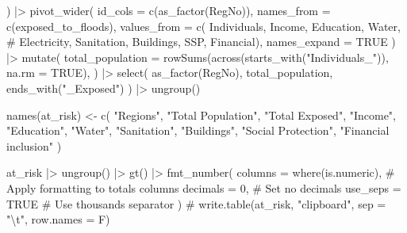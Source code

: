 \documentclass[
  letterpaper,
  DIV=11,
  numbers=noendperiod]{scrartcl}
\newenvironment{Shaded}{}{}
\newcommand{\AttributeTok}[1]{\textcolor[rgb]{0.84,0.23,0.29}{#1}}
\newcommand{\CommentTok}[1]{\textcolor[rgb]{0.42,0.45,0.49}{#1}}
\newcommand{\ConstantTok}[1]{\textcolor[rgb]{0.00,0.36,0.77}{#1}}
\newcommand{\DecValTok}[1]{\textcolor[rgb]{0.00,0.36,0.77}{#1}}
\newcommand{\FunctionTok}[1]{\textcolor[rgb]{0.44,0.26,0.76}{#1}}
\newcommand{\NormalTok}[1]{\textcolor[rgb]{0.14,0.16,0.18}{#1}}
\newcommand{\OtherTok}[1]{\textcolor[rgb]{0.44,0.26,0.76}{#1}}
\newcommand{\SpecialCharTok}[1]{\textcolor[rgb]{0.00,0.36,0.77}{#1}}
\newcommand{\StringTok}[1]{\textcolor[rgb]{0.01,0.18,0.38}{#1}}
\begin{document}
\begin{Shaded}
\begin{Highlighting}[]
\NormalTok{  ) }\SpecialCharTok{|\textgreater{}} 
  \FunctionTok{pivot\_wider}\NormalTok{(}
    \AttributeTok{id\_cols =} \FunctionTok{c}\NormalTok{(}\StringTok{\textasciigrave{}}\AttributeTok{as\_factor(RegNo)}\StringTok{\textasciigrave{}}\NormalTok{),}
    \AttributeTok{names\_from =} \FunctionTok{c}\NormalTok{(exposed\_to\_floods),}
    \AttributeTok{values\_from =} \FunctionTok{c}\NormalTok{(}
\NormalTok{      Individuals,}
\NormalTok{      Income,}
\NormalTok{      Education,}
\NormalTok{      Water,}
      \CommentTok{\# Electricity,}
\NormalTok{      Sanitation,}
\NormalTok{      Buildings,}
\NormalTok{      SSP,}
\NormalTok{      Financial),}
    \AttributeTok{names\_expand =} \ConstantTok{TRUE}
\NormalTok{  ) }\SpecialCharTok{|\textgreater{}} 
  \FunctionTok{mutate}\NormalTok{(}
    \AttributeTok{total\_population =} \FunctionTok{rowSums}\NormalTok{(}\FunctionTok{across}\NormalTok{(}\FunctionTok{starts\_with}\NormalTok{(}\StringTok{"Individuals\_"}\NormalTok{)), }\AttributeTok{na.rm =} \ConstantTok{TRUE}\NormalTok{),}
\NormalTok{  ) }\SpecialCharTok{|\textgreater{}} 
  \FunctionTok{select}\NormalTok{(}
    \StringTok{\textasciigrave{}}\AttributeTok{as\_factor(RegNo)}\StringTok{\textasciigrave{}}\NormalTok{,}
\NormalTok{    total\_population,}
    \FunctionTok{ends\_with}\NormalTok{(}\StringTok{"\_Exposed"}\NormalTok{)}
\NormalTok{  ) }\SpecialCharTok{|\textgreater{}} 
  \FunctionTok{ungroup}\NormalTok{()}

\FunctionTok{names}\NormalTok{(at\_risk) }\OtherTok{\textless{}{-}} \FunctionTok{c}\NormalTok{(}
  \StringTok{"Regions"}\NormalTok{,}
  \StringTok{"Total Population"}\NormalTok{,}
  \StringTok{"Total Exposed"}\NormalTok{,}
  \StringTok{"Income"}\NormalTok{,}
  \StringTok{"Education"}\NormalTok{,}
  \StringTok{"Water"}\NormalTok{,}
  \StringTok{"Sanitation"}\NormalTok{,}
  \StringTok{"Buildings"}\NormalTok{,}
  \StringTok{"Social Protection"}\NormalTok{,}
  \StringTok{"Financial inclusion"}
\NormalTok{)}

\NormalTok{at\_risk }\SpecialCharTok{|\textgreater{}} 
  \FunctionTok{ungroup}\NormalTok{() }\SpecialCharTok{|\textgreater{}} 
  \FunctionTok{gt}\NormalTok{() }\SpecialCharTok{|\textgreater{}} 
  \FunctionTok{fmt\_number}\NormalTok{(}
    \AttributeTok{columns =} \FunctionTok{where}\NormalTok{(is.numeric),   }\CommentTok{\# Apply formatting to totals columns}
    \AttributeTok{decimals =} \DecValTok{0}\NormalTok{,                 }\CommentTok{\# Set no decimals}
    \AttributeTok{use\_seps =} \ConstantTok{TRUE}               \CommentTok{\# Use thousands separator}
\NormalTok{  )}
\CommentTok{\# write.table(at\_risk, "clipboard", sep = "\textbackslash{}t", row.names = F)}
\end{Highlighting}
\end{Shaded}
\end{document}
